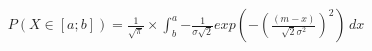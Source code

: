 \documentclass[preview]{standalone}
\begin{document}
\begin{align*}
P( X \in [a;b] ) = { \frac{1}{\sqrt{\pi}} } \times \int_b^a { { - \frac{1}{\sigma \sqrt{2}} } exp(-{ (\frac{(m - x)}{\sqrt{2} \sigma^2})^2 }) } \, dx
\end{align*}
\end{document}
